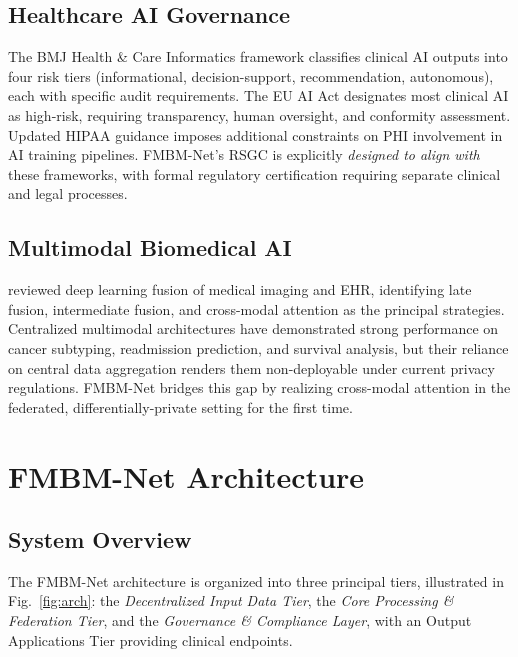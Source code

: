 \documentclass[a4paper,fleqn]{cas-dc}
\begin{document}
\subsection{Healthcare AI Governance}

The BMJ Health \& Care Informatics framework \citep{bmj_governance_2026}
classifies clinical AI outputs into four risk tiers (informational,
decision-support, recommendation, autonomous), each with specific audit
requirements. The EU AI Act \citep{eu_ai_act_2024} designates most clinical AI
as high-risk, requiring transparency, human oversight, and conformity
assessment. Updated HIPAA guidance \citep{hipaa_guidance_2024} imposes
additional constraints on PHI involvement in AI training pipelines.
FMBM-Net's RSGC is explicitly \emph{designed to align with} these frameworks,
with formal regulatory certification requiring separate clinical and legal
processes.

\subsection{Multimodal Biomedical AI}

\citet{huang2021multimodal} reviewed deep learning fusion of medical imaging
and EHR, identifying late fusion, intermediate fusion, and cross-modal attention
as the principal strategies. Centralized multimodal architectures have
demonstrated strong performance on cancer subtyping, readmission prediction,
and survival analysis, but their reliance on central data aggregation renders
them non-deployable under current privacy regulations. FMBM-Net bridges this
gap by realizing cross-modal attention in the federated, differentially-private
setting for the first time.

\section{FMBM-Net Architecture}
\label{sec:architecture}

\subsection{System Overview}

The FMBM-Net architecture is organized into three principal tiers, illustrated
in Fig.~\ref{fig:arch}: the \emph{Decentralized Input Data Tier}, the
\emph{Core Processing \& Federation Tier}, and the
\emph{Governance \& Compliance Layer}, with an Output Applications Tier
providing clinical endpoints.
\end{document}
